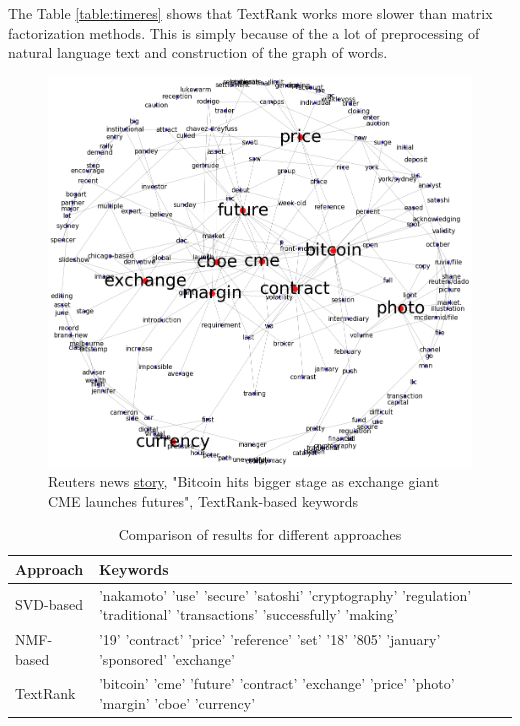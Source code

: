 \documentclass[a4paper]{article}
\begin{document}
The Table \ref{table:timeres} shows that TextRank works more slower than matrix factorization methods. This is simply because of the a lot of preprocessing of natural language text and construction of the graph of words.

\begin{center}
\begin{figure}[h!]
\includegraphics[scale=1, width=\textwidth]{textrank_example.png}
\caption{Reuters news \href{https://uk.reuters.com/article/us-bitcoin-futures/exchange-giant-cmes-bitcoin-futures-get-tepid-take-up-in-debut-idUKKBN1EB04N}{story}, "Bitcoin hits bigger stage as exchange giant CME launches futures", TextRank-based keywords}
\end{figure}
\end{center}

    \begin{table}[h!]
      \center
      \begin{tabular}{|p{3cm}|p{14cm}|}
      \hline
      Approach & Keywords \\
      \hline
      SVD-based & 'nakamoto' 'use' 'secure' 'satoshi' 'cryptography' 'regulation' 'traditional' 'transactions' 'successfully' 'making' \\
      \hline
      NMF-based & '19' 'contract' 'price' 'reference' 'set' '18' '805' 'january' 'sponsored' 'exchange' \\
      \hline
      TextRank & 'bitcoin' 'cme' 'future' 'contract' 'exchange' 'price' 'photo' 'margin' 'cboe' 'currency' \\
      \hline
      \end{tabular}
      \caption{Comparison of results for different approaches}
    \end{table}
\end{document}
